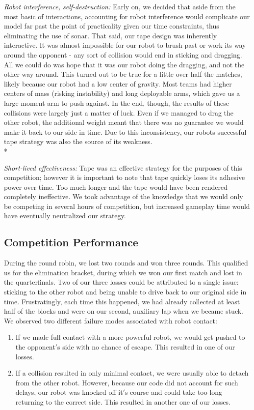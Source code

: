 \documentclass[11.5pt]{article}
\begin{document}
\noindent
\textit{Robot interference, self-destruction:}   Early on, we decided that aside from the most basic of interactions, accounting for robot interference would complicate our model far past the point of practicality given our time constraints, thus eliminating the use of sonar. That said, our tape design was inherently interactive. It was almost impossible for our robot to brush past or work its way around the opponent - any sort of collision would end in sticking and dragging. All we could do was hope that it was our robot doing the dragging, and not the other way around. This turned out to be true for a little over half the matches, likely because our robot had a low center of gravity. Most teams had higher centers of mass (risking instability) and long deployable arms, which gave us a large moment arm to push against. In the end, though, the results of these collisions were largely just a matter of luck. Even if we managed to drag the other robot, the additional weight meant that there was no guarantee we would make it back to our side in time. Due to this inconsistency, our robot\textquotesingle s successful tape strategy was also the source of its weakness. 
\\*

\noindent
\textit{Short-lived effectiveness:} Tape was an effective strategy for the purposes of this competition; however it is important to note that tape quickly loses its adhesive power over time. Too much longer and the tape would have been rendered completely ineffective. We took advantage of the knowledge that we would only be competing in several hours of competition, but increased gameplay time would have eventually neutralized our strategy. 

\subsection{Competition Performance}
During the round robin, we lost two rounds and won three rounds. This qualified us for the elimination bracket, during which we won our first match and lost in the quarterfinals. Two of our three losses could be attributed to a single issue: sticking to the other robot and being unable to drive back to our original side in time. Frustratingly, each time this happened, we had already collected at least half of the blocks and were on our second, auxiliary lap when we became stuck. We observed two different failure modes associated with robot contact:
\begin{enumerate}
    \item If we made full contact with a more powerful robot, we would get pushed to the opponent$'$s side with no chance of escape. This resulted in one of our losses. 
    \item If a collision resulted in only minimal contact, we were usually able to detach from the other robot. However, because our code did not account for such delays, our robot was knocked off it$'$s course and could take too long returning to the correct side. This resulted in another one of our losses.
\end{enumerate}
\end{document}
